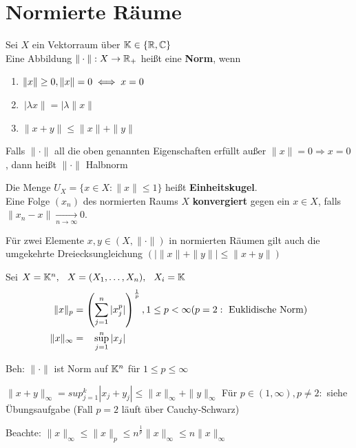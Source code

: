 \newpage
\section{Normierte R{\"a}ume}

\begin{definition} 
Sei $X$ ein Vektorraum über $\mathbb{K} \in\{ \mathbb{R}, \mathbb{C} \}$ \\
Eine Abbildung  $\| \cdot \|: X \rightarrow \mathbb{R}_{+}$ hei{\ss}t eine \textbf{Norm}, wenn
\begin{enumerate}
	\item $ \| x \| \geq 0, \| x \| = 0 \iff x = 0 $
	\item $\ | \lambda x \| = | \lambda \| x \| $
	\item $ \| x + y \| \leq \| x \| + \| y \| $
\end{enumerate}	
\end{definition}

\begin{bemerkung} Falls $ \| \cdot \| $ all die oben genannten Eigenschaften erfüllt au{\ss}er $ \| x \| = 0 \Rightarrow x = 0 $, dann hei{\ss}t $ \| \cdot \| $ Halbnorm
\end{bemerkung}

\begin{vereinbarung}    
Die Menge $ U_{X} = \{ x \in X:  \|x \| \leq 1 \}$ hei{\ss}t \textbf{Einheitskugel}. \\
Eine Folge $(x_{n})$ des normierten Raums $X$ \textbf{konvergiert} gegen ein $ x \in X $, falls  $\| x_{n} - x \| \xrightarrow[n \rightarrow \infty]{} 0. $	
\end{vereinbarung}


\begin{bemerkung}
Für zwei Elemente $x, y \in (X, \| \cdot \|)$ in normierten Räumen gilt auch die umgekehrte Dreiecksungleichung $( | \| x \| + \| y \| | \leq \| x + y \|)$
\end{bemerkung}

\begin{beispiel}
Sei $ X = \mathbb{K}^{n}, \hspace{0.25cm} X = ( X_{1}, \dotsc, X_{n}), \hspace{0.25cm} X_{i} = \mathbb{K}$ 
\begin{align*}
	\| x \|_{p} & = \left( \sum_{j = 1}^{n} |x_{j}^{p}| \right)^{\frac{1}{p}},  1 \leq p < \infty (p = 2: \text{ Euklidische Norm}) \\
	\| x \|_{\infty} & = \hspace{0.3cm} \sup_{j = 1}^{n} |x_{j}|	
\end{align*}

Beh: $\| \cdot \| $ ist Norm auf $\mathbb{K}^n$ für $1 \leq p \leq \infty$

$\| x + y \|_{\infty} = sup_{j = 1}^{k} |x_{j} + y_{j}| \leq \|x\|_{\infty} + \|y\|_{\infty} $
Für $p \in (1, \infty), p \neq 2:$ siehe Übungsaufgabe (Fall $p = 2$ läuft über Cauchy-Schwarz)

Beachte: $\|x\|_{\infty} \leq  \|x\|_{p} \leq n^{\frac{1}{p}} \|x\|_{\infty} \leq n \| x \|_{\infty}$
\end{beispiel}

